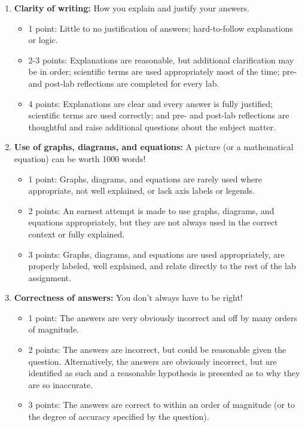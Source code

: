 \documentclass[12pt]{article}
\begin{document}
\begin{enumerate}
\item \textbf{Clarity of writing:} How you explain and justify your answers.
\begin{itemize}
	\item 1 point: Little to no justification of answers; hard-to-follow explanations or logic.
	\item 2-3 points: Explanations are reasonable, but additional clarification may be in order; scientific terms are used appropriately most of the time; pre- and post-lab reflections are completed for every lab.
	\item 4 points: Explanations are clear and every answer is fully justified; scientific terms are used correctly; and pre- and post-lab reflections are thoughtful and raise additional questions about the subject matter.
\end{itemize}
\item \textbf{Use of graphs, diagrams, and equations:} A picture (or a mathematical equation) can be worth 1000 words!
\begin{itemize}
	\item 1 point: Graphs, diagrams, and equations are rarely used where appropriate, not well explained, or lack axis labels or legends.
	\item 2 points: An earnest attempt is made to use graphs, diagrams, and equations appropriately, but they are not always used in the correct context or fully explained.
	\item 3 points: Graphs, diagrams, and equations are used appropriately, are properly labeled, well explained, and relate directly to the rest of the lab assignment.
\end{itemize}
\item \textbf{Correctness of answers:} You don't always have to be right!
\begin{itemize}
	\item 1 point: The answers are very obviously incorrect and off by many orders of magnitude.
	\item 2 points: The answers are incorrect, but could be reasonable given the question. Alternatively, the answers are obviously incorrect, but are identified as such and a reasonable hypothesis is presented as to why they are so inaccurate.
	\item 3 points: The answers are correct to within an order of magnitude (or to the degree of accuracy specified by the question).
\end{itemize}
\end{enumerate}
\end{document}
